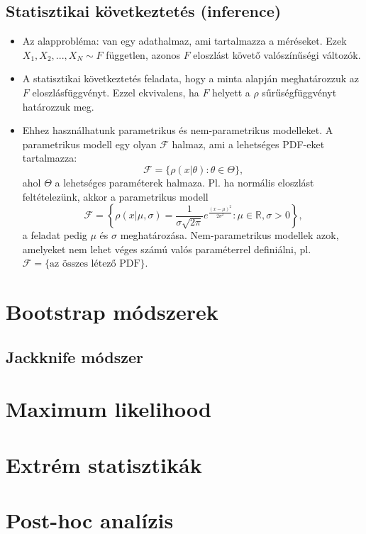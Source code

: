 \documentclass[12pt]{article}
\theoremstyle{plain}
\begin{document}
\subsection{Statisztikai következtetés (inference)}
\begin{itemize}
    \item Az alapprobléma: van egy adathalmaz, ami tartalmazza a méréseket. Ezek $X_1, X_2, ..., X_N \sim F$ független, 
    azonos $F$ eloszlást követő valószínűségi változók.
    \item A statisztikai következtetés feladata, hogy a minta alapján meghatározzuk az $F$ eloszlásfüggvényt. Ezzel ekvivalens,
    ha $F$ helyett a $\rho$ sűrűségfüggvényt határozzuk meg.
    \item Ehhez használhatunk parametrikus és nem-parametrikus modelleket. A parametrikus modell egy olyan $\mathcal F$ halmaz, 
    ami a lehetséges PDF-eket tartalmazza:
    \begin{equation*}
        \mathcal F = \{\rho(x|\theta) : \theta \in \Theta\}\text{,}
    \end{equation*}
    ahol $\Theta$ a lehetséges paraméterek halmaza. Pl. ha normális eloszlást feltételezünk, akkor a parametrikus modell
    \begin{equation*}
        \mathcal F = \left\{\rho(x|\mu, \sigma) = \frac{1}{\sigma\sqrt{2\pi}}e^{\frac{(x-\mu)^2}{2\sigma^2}} : \mu\in\mathbb R, \sigma>0 \right\}\text{,}
    \end{equation*}
    a feladat pedig $\mu$ és $\sigma$ meghatározása. Nem-parametrikus modellek azok, amelyeket nem lehet véges számú valós paraméterrel
    definiálni, pl. $\mathcal F = \{\text{az összes létező PDF}\}$.
\end{itemize}
\section{Bootstrap módszerek}

\subsection{Jackknife módszer}
\section{Maximum likelihood}
\section{Extrém statisztikák}
\section{Post-hoc analízis}
\end{document}
